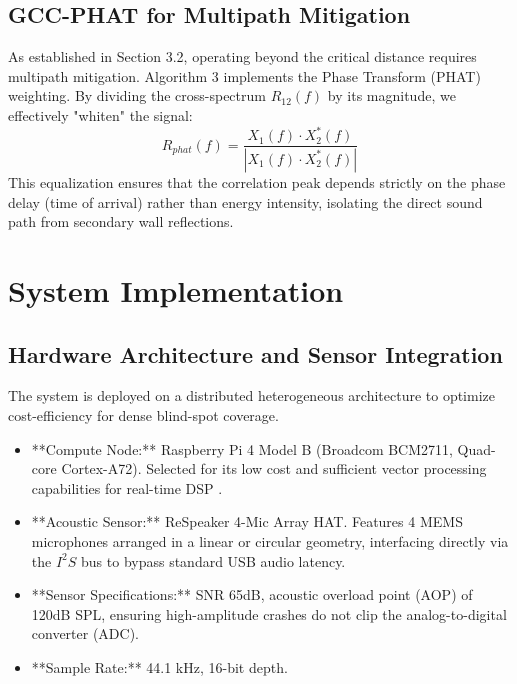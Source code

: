 \documentclass[conference]{IEEEtran}
\begin{document}
\subsection{GCC-PHAT for Multipath Mitigation}
As established in Section 3.2, operating beyond the critical distance requires multipath mitigation. Algorithm 3 implements the Phase Transform (PHAT) weighting. By dividing the cross-spectrum $R_{12}(f)$ by its magnitude, we effectively "whiten" the signal:
\begin{equation}
R_{phat}(f) = \frac{X_1(f) \cdot X_2^*(f)}{|X_1(f) \cdot X_2^*(f)|}
\end{equation}
This equalization ensures that the correlation peak depends strictly on the phase delay (time of arrival) rather than energy intensity, isolating the direct sound path from secondary wall reflections.



\section{System Implementation}

\subsection{Hardware Architecture and Sensor Integration}
The system is deployed on a distributed heterogeneous architecture to optimize cost-efficiency for dense blind-spot coverage.
\begin{itemize}
    \item **Compute Node:** Raspberry Pi 4 Model B (Broadcom BCM2711, Quad-core Cortex-A72). Selected for its low cost and sufficient vector processing capabilities for real-time DSP \cite{b26}.
    \item **Acoustic Sensor:** ReSpeaker 4-Mic Array HAT. Features 4 MEMS microphones arranged in a linear or circular geometry, interfacing directly via the $I^2S$ bus to bypass standard USB audio latency.
    \item **Sensor Specifications:** SNR 65dB, acoustic overload point (AOP) of 120dB SPL, ensuring high-amplitude crashes do not clip the analog-to-digital converter (ADC).
    \item **Sample Rate:** 44.1 kHz, 16-bit depth.
\end{itemize}
\end{document}
